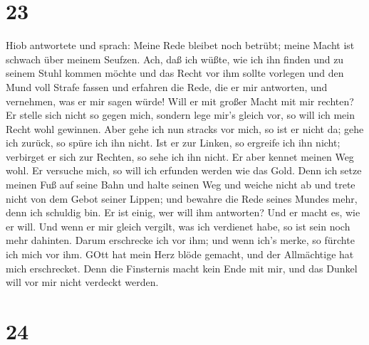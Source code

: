\hypertarget{section-22}{%
\section{23}\label{section-22}}

 Hiob antwortete und sprach:  Meine Rede bleibet
noch betrübt; meine Macht ist schwach über meinem Seufzen. 
Ach, daß ich wüßte, wie ich ihn finden und zu seinem Stuhl kommen möchte
 und das Recht vor ihm sollte vorlegen und den Mund voll
Strafe fassen  und erfahren die Rede, die er mir antworten,
und vernehmen, was er mir sagen würde!  Will er mit großer
Macht mit mir rechten? Er stelle sich nicht so gegen mich, 
sondern lege mir's gleich vor, so will ich mein Recht wohl gewinnen.
 Aber gehe ich nun stracks vor mich, so ist er nicht da;
gehe ich zurück, so spüre ich ihn nicht.  Ist er zur Linken,
so ergreife ich ihn nicht; verbirget er sich zur Rechten, so sehe ich
ihn nicht.  Er aber kennet meinen Weg wohl. Er versuche
mich, so will ich erfunden werden wie das Gold.  Denn ich
setze meinen Fuß auf seine Bahn und halte seinen Weg und weiche nicht ab
 und trete nicht von dem Gebot seiner Lippen; und bewahre
die Rede seines Mundes mehr, denn ich schuldig bin.  Er ist
einig, wer will ihm antworten? Und er macht es, wie er will.
 Und wenn er mir gleich vergilt, was ich verdienet habe, so
ist sein noch mehr dahinten.  Darum erschrecke ich vor ihm;
und wenn ich's merke, so fürchte ich mich vor ihm.  GOtt
hat mein Herz blöde gemacht, und der Allmächtige hat mich erschrecket.
 Denn die Finsternis macht kein Ende mit mir, und das
Dunkel will vor mir nicht verdeckt werden.

\hypertarget{section-23}{%
\section{24}\label{section-23}}

